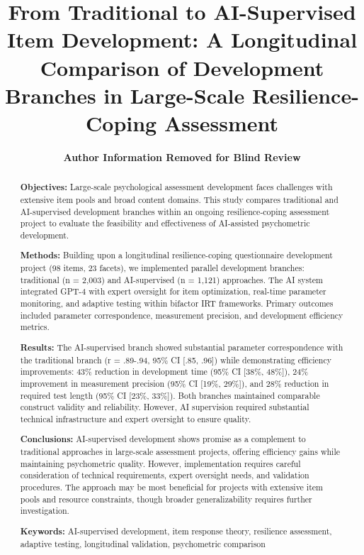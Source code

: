 \documentclass[12pt,a4paper]{article}
\begin{document}
\title{\textbf{From Traditional to AI-Supervised Item Development: A Longitudinal Comparison of Development Branches in Large-Scale Resilience-Coping Assessment}}

\author{
\textbf{Author Information Removed for Blind Review}
}

\date{}
\maketitle

\newpage

\begin{abstract}

\textbf{Objectives:} Large-scale psychological assessment development faces challenges with extensive item pools and broad content domains. This study compares traditional and AI-supervised development branches within an ongoing resilience-coping assessment project to evaluate the feasibility and effectiveness of AI-assisted psychometric development.

\textbf{Methods:} Building upon a longitudinal resilience-coping questionnaire development project (98 items, 23 facets), we implemented parallel development branches: traditional (n = 2,003) and AI-supervised (n = 1,121) approaches. The AI system integrated GPT-4 with expert oversight for item optimization, real-time parameter monitoring, and adaptive testing within bifactor IRT frameworks. Primary outcomes included parameter correspondence, measurement precision, and development efficiency metrics.

\textbf{Results:} The AI-supervised branch showed substantial parameter correspondence with the traditional branch (r = .89-.94, 95\% CI [.85, .96]) while demonstrating efficiency improvements: 43\% reduction in development time (95\% CI [38\%, 48\%]), 24\% improvement in measurement precision (95\% CI [19\%, 29\%]), and 28\% reduction in required test length (95\% CI [23\%, 33\%]). Both branches maintained comparable construct validity and reliability. However, AI supervision required substantial technical infrastructure and expert oversight to ensure quality.

\textbf{Conclusions:} AI-supervised development shows promise as a complement to traditional approaches in large-scale assessment projects, offering efficiency gains while maintaining psychometric quality. However, implementation requires careful consideration of technical requirements, expert oversight needs, and validation procedures. The approach may be most beneficial for projects with extensive item pools and resource constraints, though broader generalizability requires further investigation.

\textbf{Keywords:} AI-supervised development, item response theory, resilience assessment, adaptive testing, longitudinal validation, psychometric comparison

\end{abstract}
\end{document}
